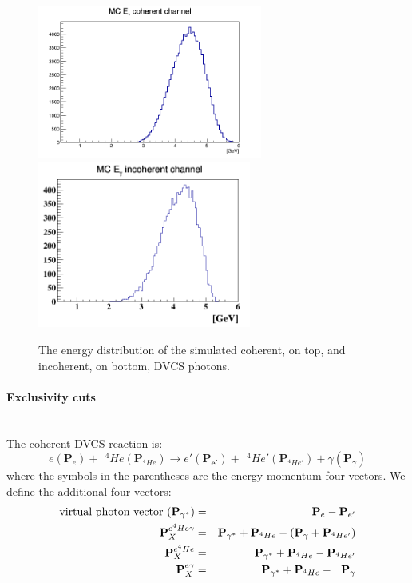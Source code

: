 \begin{itemize}
\begin{figure}[tbp]
      \includegraphics[height=5.0cm]{fig_dvcs/photon_energy_coh_sim.png}
      \includegraphics[height=5.5cm]{fig_dvcs/photon_energy_incoh_sim.png}
          \caption{The energy distribution of the simulated coherent, on top, 
          and incoherent, on bottom, DVCS photons.}
          \label{fig:energy_dvcs_photons}
\end{figure}


\end{itemize}

\paragraph{Exclusivity cuts}

~\\
The coherent DVCS reaction is:
\begin{equation}
e(\mathbf{P}_{e}) + ~~^{4}He(\mathbf{P}_{^{4}He}) \rightarrow e'(\mathbf{P_{e'}}) +  ~~^{4}He'(\mathbf{P}_{^{4}He'}) + \gamma(\mathbf{P}_{\gamma})
\label{coh_dvcs_equ}
\end{equation}
where the symbols in the parentheses are the energy-momentum four-vectors. We define the additional four-vectors:
\begin{eqnarray}
\text{virtual photon vector } (\mathbf{P}_{\gamma^{*}}) &=&  \mathbf{P}_{e} -  \mathbf{P}_{e'} \\
\hspace{0.4in}  \mathbf{P}^{e^{4}He\gamma}_{X} &=& \mathbf{P}_{\gamma^{*}} + \mathbf{P}_{^{4}He} - (\mathbf{P}_{\gamma} + \mathbf{P}_{^{4}He'})\\
~~~~~~~~~~\mathbf{P}^{e^{4}He}_{X} &=& \mathbf{P}_{\gamma^{*}} + \mathbf{P}_{^{4}He} -  \mathbf{P}_{^{4}He'} \\
\hspace{0.2in} \mathbf{P}^{e\gamma}_{X} &=& \mathbf{P}_{\gamma^{*}} + \mathbf{P}_{^{4}He} - ~~\mathbf{P}_{\gamma}
\end{eqnarray}

